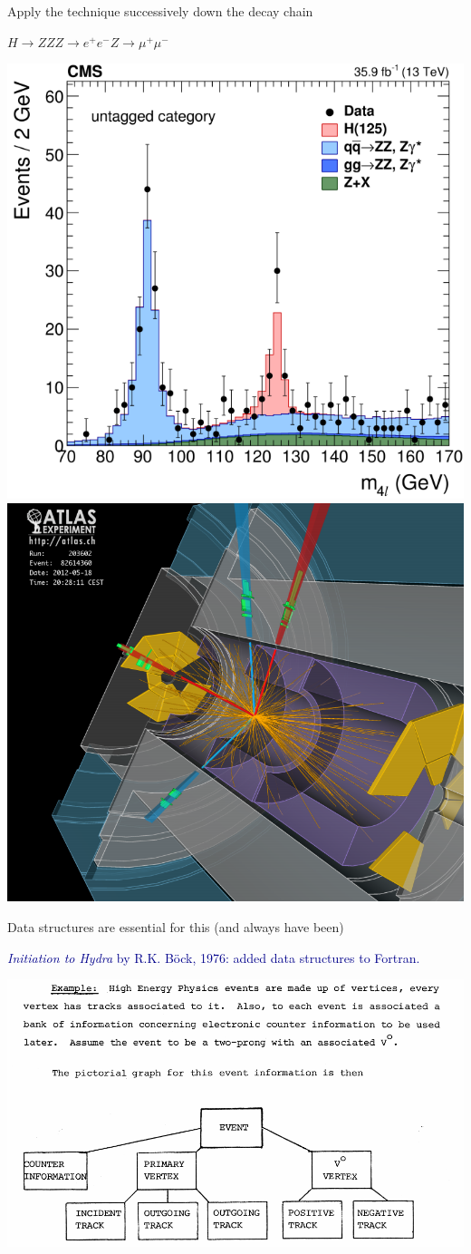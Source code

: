 \documentclass[aspectratio=169]{beamer}
\begin{document}
\begin{frame}{Apply the technique successively down the decay chain}
\Large
\begin{center}
$H \to ZZ$\hspace{1 cm}$Z \to e^+e^-$\hspace{1 cm}$Z \to \mu^+\mu^-$
\end{center}

\includegraphics[height=6 cm]{img/higgs-to-four-leptons.png}\hfill\includegraphics[height=6 cm]{img/higgs-to-four-leptons-2.png}
\end{frame}

\begin{frame}{Data structures are essential for this (and always have been)}
\large
\vspace{0.5 cm}

\vspace{0.25 cm}
\textcolor{darkblue}{{\it Initiation to Hydra} by R.K. B\"ock, 1976: added data structures to Fortran.}

\begin{center}
\includegraphics[width=0.7\linewidth]{img/hydra-3.png}
\end{center}
\end{frame}
\end{document}
